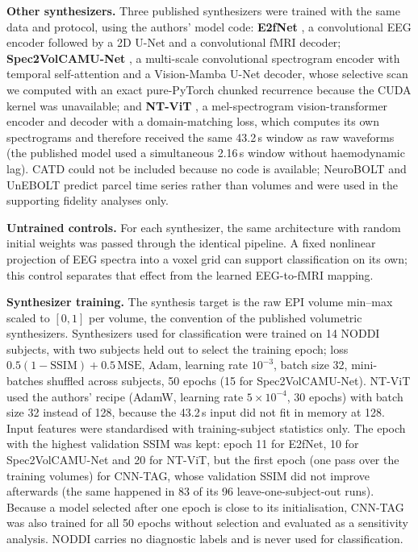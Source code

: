 \documentclass[pdflatex,referee,sn-basic]{sn-jnl}%
\begin{document}
\noindent\textbf{Other synthesizers.} Three published synthesizers were trained with the same data and protocol, using the authors' model code: \textbf{E2fNet} \cite{roos2025brainwaves}, a convolutional EEG encoder followed by a 2D U-Net and a convolutional fMRI decoder; \textbf{Spec2VolCAMU-Net} \cite{he2025spec2vol}, a multi-scale convolutional spectrogram encoder with temporal self-attention and a Vision-Mamba U-Net decoder, whose selective scan we computed with an exact pure-PyTorch chunked recurrence because the CUDA kernel was unavailable; and \textbf{NT-ViT} \cite{lanzino2024ntvit}, a mel-spectrogram vision-transformer encoder and decoder with a domain-matching loss, which computes its own spectrograms and therefore received the same 43.2\,s window as raw waveforms (the published model used a simultaneous 2.16\,s window without haemodynamic lag). CATD \cite{yao2025catd} could not be included because no code is available; NeuroBOLT and UnEBOLT \cite{li2024neurobolt,li2026unebolt} predict parcel time series rather than volumes and were used in the supporting fidelity analyses only.

\noindent\textbf{Untrained controls.} For each synthesizer, the same architecture with random initial weights was passed through the identical pipeline. A fixed nonlinear projection of EEG spectra into a voxel grid can support classification on its own; this control separates that effect from the learned EEG-to-fMRI mapping.

\noindent\textbf{Synthesizer training.} The synthesis target is the raw EPI volume min--max scaled to $[0,1]$ per volume, the convention of the published volumetric synthesizers. Synthesizers used for classification were trained on 14 NODDI subjects, with two subjects held out to select the training epoch; loss $0.5(1-\mathrm{SSIM})+0.5\,\mathrm{MSE}$, Adam, learning rate $10^{-3}$, batch size 32, mini-batches shuffled across subjects, 50 epochs (15 for Spec2VolCAMU-Net). NT-ViT used the authors' recipe (AdamW, learning rate $5\times10^{-4}$, 30 epochs) with batch size 32 instead of 128, because the 43.2\,s input did not fit in memory at 128. Input features were standardised with training-subject statistics only. The epoch with the highest validation SSIM was kept: epoch 11 for E2fNet, 10 for Spec2VolCAMU-Net and 20 for NT-ViT, but the first epoch (one pass over the training volumes) for CNN-TAG, whose validation SSIM did not improve afterwards (the same happened in 83 of its 96 leave-one-subject-out runs). Because a model selected after one epoch is close to its initialisation, CNN-TAG was also trained for all 50 epochs without selection and evaluated as a sensitivity analysis. NODDI carries no diagnostic labels and is never used for classification.
\end{document}
